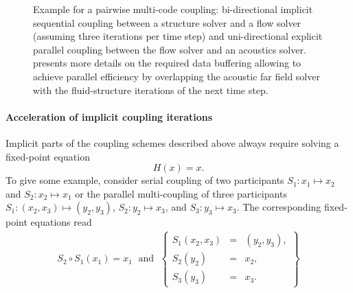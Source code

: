 \begin{figure}[h!]
\begin{minipage}{0.48\textwidth}
     \end{minipage}
  \caption{
    \label{fig:exafsa} Example for a pairwise multi-code coupling: bi-directional implicit sequential coupling between a structure solver and a flow solver (assuming three iterations per time step) and uni-directional explicit parallel coupling between the flow solver and an acoustics solver.~\cite{Lindner2020_ExaFSA} presents more details on the required data buffering allowing to achieve parallel efficiency by overlapping the acoustic far field solver with the fluid-structure iterations of the next time step.}
\end{figure}

\paragraph{Acceleration of implicit coupling iterations} 
Implicit parts of the coupling schemes described above always require solving a fixed-point equation
\begin{equation*}
H(x) = x.
\end{equation*}
To give some example, consider serial coupling of two participants $S_1: x_1 \mapsto x_2$ and $S_2: x_2 \mapsto x_1$ or the parallel multi-coupling of three participants $S_1: (x_2, x_3) \mapsto (y_2, y_3)$, $S_2: y_2 \mapsto x_3$, and $S_3: y_3 \mapsto x_3$. The corresponding fixed-point equations read
\begin{eqnarray*}
  S_2 \circ S_1(x_1) = x_1 \; \mbox{ and } \;
  \left\{ \begin{array}{ccc}
    S_1(x_2,x_3) & = & (y_2, y_3), \\
    S_2(y_2) & = &  x_2, \\
    S_3(y_3) & = & x_3. 
  \end{array} \right\}
\end{eqnarray*}

